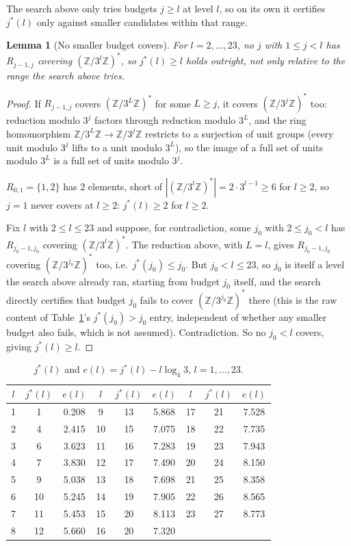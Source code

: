 \documentclass[11pt]{amsart}
\theoremstyle{plain}
\newtheorem{lemma}[theorem]{Lemma}
\theoremstyle{definition}
\theoremstyle{remark}
\newcommand{\Z}{\mathbb{Z}}
\begin{document}
The search above only tries budgets $j\ge l$ at level $l$, so on its own it certifies $j^*(l)$ only
against smaller candidates within that range.

\begin{lemma}[No smaller budget covers]
\label{lem:nosmaller}
For $l=2,\dots,23$, no $j$ with $1\le j<l$ has $R_{j-1,j}$ covering $(\Z/3^l\Z)^*$, so $j^*(l)\ge l$ holds outright,
not only relative to the range the search above tries.
\end{lemma}

\begin{proof}
If $R_{j-1,j}$ covers $(\Z/3^L\Z)^*$ for some $L\ge j$, it covers $(\Z/3^j\Z)^*$ too: reduction
modulo $3^j$ factors through reduction modulo $3^L$, and the ring homomorphism
$\Z/3^L\Z\to\Z/3^j\Z$ restricts to a surjection of unit groups (every unit modulo $3^j$ lifts to a
unit modulo $3^L$), so the image of a full set of units modulo $3^L$ is a full set of units modulo
$3^j$.

$R_{0,1}=\{1,2\}$ has $2$ elements, short of $|(\Z/3^l\Z)^*|=2\cdot3^{l-1}\ge6$ for $l\ge2$, so
$j=1$ never covers at $l\ge2$: $j^*(l)\ge2$ for $l\ge2$.

Fix $l$ with $2\le l\le23$ and suppose, for contradiction, some $j_0$ with $2\le j_0<l$ has
$R_{j_0-1,j_0}$ covering $(\Z/3^l\Z)^*$. The reduction above, with $L=l$, gives $R_{j_0-1,j_0}$
covering $(\Z/3^{j_0}\Z)^*$ too, i.e.\ $j^*(j_0)\le j_0$. But $j_0<l\le23$, so $j_0$ is itself a
level the search above already ran, starting from budget $j_0$ itself, and the search directly
certifies that budget $j_0$ fails to cover $(\Z/3^{j_0}\Z)^*$ there (this is the raw content of
Table~\ref{tab:jstar}'s $j^*(j_0)>j_0$ entry, independent of whether any smaller budget also fails,
which is not assumed). Contradiction. So no $j_0<l$ covers, giving $j^*(l)\ge l$.
\end{proof}

\begin{table}[h]
\centering
\begin{tabular}{c|c|c||c|c|c||c|c|c}
$l$ & $j^*(l)$ & $e(l)$ & $l$ & $j^*(l)$ & $e(l)$ & $l$ & $j^*(l)$ & $e(l)$ \\ \hline
1 & 1 & 0.208 & 9 & 13 & 5.868 & 17 & 21 & 7.528 \\
2 & 4 & 2.415 & 10 & 15 & 7.075 & 18 & 22 & 7.735 \\
3 & 6 & 3.623 & 11 & 16 & 7.283 & 19 & 23 & 7.943 \\
4 & 7 & 3.830 & 12 & 17 & 7.490 & 20 & 24 & 8.150 \\
5 & 9 & 5.038 & 13 & 18 & 7.698 & 21 & 25 & 8.358 \\
6 & 10 & 5.245 & 14 & 19 & 7.905 & 22 & 26 & 8.565 \\
7 & 11 & 5.453 & 15 & 20 & 8.113 & 23 & 27 & 8.773 \\
8 & 12 & 5.660 & 16 & 20 & 7.320 & & & \\
\end{tabular}
\caption{$j^*(l)$ and $e(l) = j^*(l) - l\log_4 3$, $l=1,\dots,23$.}
\label{tab:jstar}
\end{table}
\end{document}
